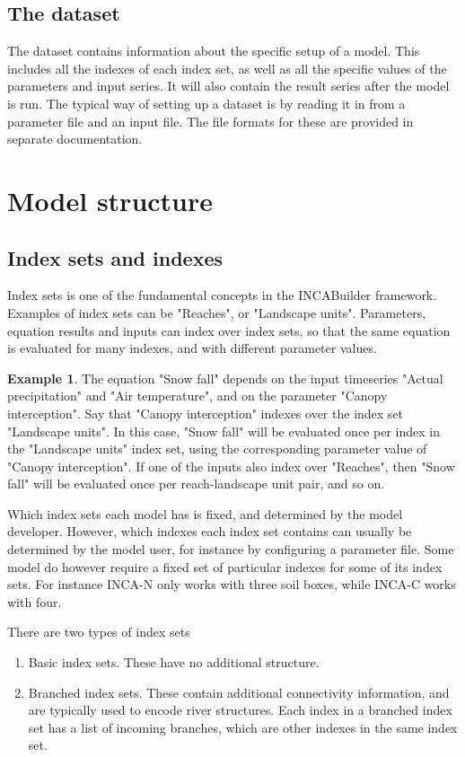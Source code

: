 \documentclass[11pt]{article}
\theoremstyle{definition}
\newtheorem{myexample}{Example}
\newenvironment{example}%
  {\begin{lrbox}{\examplebox}%
   \begin{minipage}{\dimexpr\linewidth-2\fboxsep}
   \begin{myexample}}%
  {\end{myexample}%
   \end{minipage}%
   \end{lrbox}%
   \begin{trivlist}
     \item[]\colorbox{silver}{\usebox\examplebox}
   \end{trivlist}}
\begin{document}
\subsection{The dataset}

The dataset contains information about the specific setup of a model. This includes all the indexes of each index set, as well as all the specific values of the parameters and input series. It will also contain the result series after the model is run. The typical way of setting up a dataset is by reading it in from a parameter file and an input file. The file formats for these are provided in separate documentation.

\section{Model structure}

\subsection{Index sets and indexes}

Index sets is one of the fundamental concepts in the INCABuilder framework. Examples of index sets can be "Reaches", or "Landscape units". Parameters, equation results and inputs can index over index sets, so that the same equation is evaluated for many indexes, and with different parameter values.

\begin{example}
The equation "Snow fall" depends on the input timeseries "Actual precipitation" and "Air temperature", and on the parameter "Canopy interception". Say that "Canopy interception" indexes over the index set "Landscape units". In this case, "Snow fall" will be evaluated once per index in the "Landscape units" index set, using the corresponding parameter value of "Canopy interception". If one of the inputs also index over "Reaches", then "Snow fall" will be evaluated once per reach-landscape unit pair, and so on.
\end{example}

Which index sets each model has is fixed, and determined by the model developer. However, which indexes each index set contains can usually be determined by the model user, for instance by configuring a parameter file. Some model do however require a fixed set of particular indexes for some of its index sets. For instance INCA-N only works with three soil boxes, while INCA-C works with four.

There are two types of index sets
\begin{enumerate}[i]
\item Basic index sets. These have no additional structure.
\item Branched index sets. These contain additional connectivity information, and are typically used to encode river structures. Each index in a branched index set has a list of incoming branches, which are other indexes in the same index set.
\end{enumerate}
\end{document}
